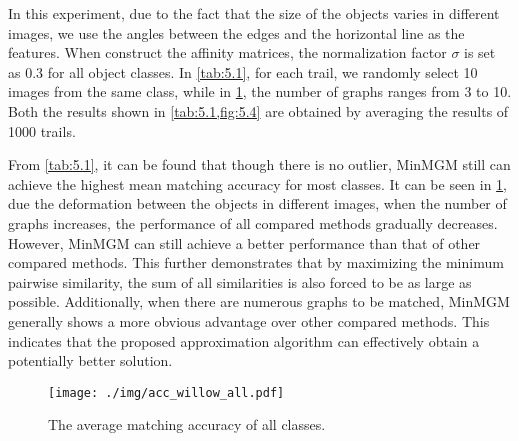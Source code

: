 In this experiment, due to the fact that the size of the objects varies in different images, we use the angles between the edges and the horizontal line as the features. When construct the affinity matrices, the normalization factor $\sigma$ is set as 0.3 for all object classes. In \cref{tab:5.1}, for each trail, we randomly select 10 images from the same class, while in \cref{fig:5.4}, the number of graphs ranges from 3 to 10. Both the results shown in \cref{tab:5.1,fig:5.4} are obtained by averaging the results of 1000 trails.

From \cref{tab:5.1}, it can be found that though there is no outlier, MinMGM still can achieve the highest mean matching accuracy for most classes. It can be seen in \cref{fig:5.4}, due the deformation between the objects in different images, when the number of graphs increases, the performance of all compared methods gradually decreases. However, MinMGM can still achieve a better performance than that of other compared methods. This further demonstrates that by maximizing the minimum pairwise similarity, the sum of all similarities is also forced to be as large as possible. Additionally, when there are numerous graphs to be matched, MinMGM generally shows a more obvious advantage over other compared methods. This indicates that the proposed approximation algorithm can effectively obtain a potentially better solution.

\begin{figure}[htb!]
    \centering
    \texttt{[image: ./img/acc\_willow\_all.pdf]}
    \caption{The average matching accuracy of all classes.}
    \label{fig:5.4}
\end{figure}
